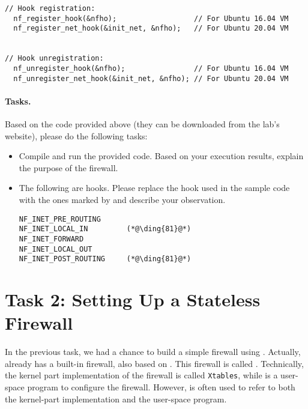 \begin{lstlisting}
// Hook registration:
  nf_register_hook(&nfho);                  // For Ubuntu 16.04 VM
  nf_register_net_hook(&init_net, &nfho);   // For Ubuntu 20.04 VM


// Hook unregistration:
  nf_unregister_hook(&nfho);                // For Ubuntu 16.04 VM
  nf_unregister_net_hook(&init_net, &nfho); // For Ubuntu 20.04 VM
\end{lstlisting}
 

\paragraph{Tasks.} Based on the code provided above (they can be downloaded
from the lab's website), please do the following tasks:

\begin{itemize}
\item Compile and run the provided code. Based on your execution results,
explain the purpose of the firewall.  

\item The following are \netfilter hooks. Please replace the 
hook used in the sample code with the ones marked by 
and describe your observation.

\begin{lstlisting}
NF_INET_PRE_ROUTING 
NF_INET_LOCAL_IN         (*@\ding{81}@*)
NF_INET_FORWARD 
NF_INET_LOCAL_OUT 
NF_INET_POST_ROUTING     (*@\ding{81}@*)
\end{lstlisting}
\end{itemize}
 



\section{Task 2: Setting Up a Stateless Firewall}

In the previous task, we had a chance to build a simple firewall using \netfilter. Actually,
\linux already has a built-in firewall, also based on \netfilter. This firewall is called
\iptables. Technically, the kernel part implementation of the firewall
is called \texttt{Xtables}, while \iptables is a user-space program to
configure the firewall. However, \iptables is often used to refer to both the kernel-part
implementation and the user-space program. 




